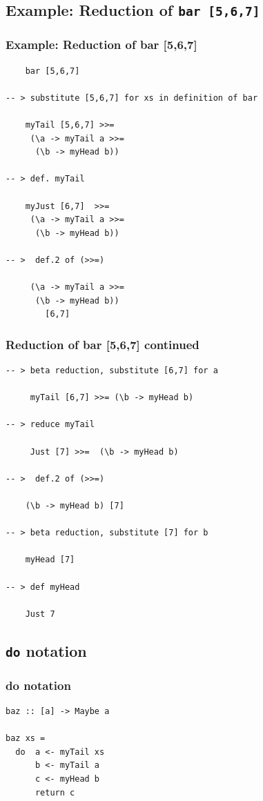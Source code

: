 \documentclass{beamer}
\begin{document}
\subsection{Example: Reduction of {\tt bar [5,6,7]}}
\begin{frame}[fragile]
\frametitle{Example: Reduction of bar [5,6,7]}

\begin{verbatim}
    bar [5,6,7]

-- > substitute [5,6,7] for xs in definition of bar

    myTail [5,6,7] >>=
     (\a -> myTail a >>=
      (\b -> myHead b))

-- > def. myTail

    myJust [6,7]  >>=
     (\a -> myTail a >>=
      (\b -> myHead b))

-- >  def.2 of (>>=)

     (\a -> myTail a >>=
      (\b -> myHead b))
        [6,7]
\end{verbatim}

\end{frame}

\begin{frame}[fragile]
\frametitle{Reduction of bar [5,6,7] continued}

\begin{verbatim}
-- > beta reduction, substitute [6,7] for a

     myTail [6,7] >>= (\b -> myHead b)

-- > reduce myTail

     Just [7] >>=  (\b -> myHead b)

-- >  def.2 of (>>=)   

    (\b -> myHead b) [7]

-- > beta reduction, substitute [7] for b

    myHead [7]

-- > def myHead

    Just 7
\end{verbatim}

\end{frame}

\subsection{{\tt do} notation}
\begin{frame}[fragile]
\frametitle{do notation}

\begin{verbatim}
baz :: [a] -> Maybe a

baz xs =
  do  a <- myTail xs
      b <- myTail a
      c <- myHead b
      return c
\end{verbatim}

\end{frame}
\end{document}
